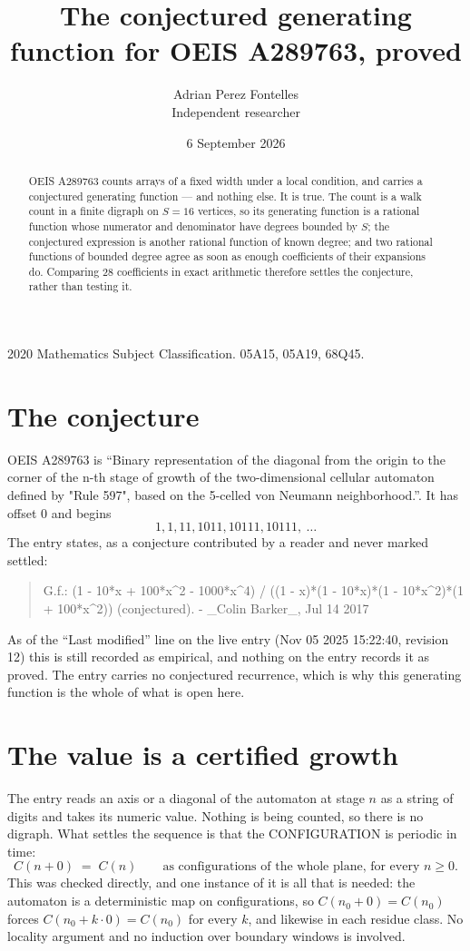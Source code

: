 \documentclass[11pt,a4paper]{article}
\title{The conjectured generating function for OEIS A289763, proved}
\author{Adrian Perez Fontelles\\ \small Independent researcher}
\date{6 September 2026}
\theoremstyle{plain}
\theoremstyle{definition}
\begin{document}
\maketitle

\begin{abstract}
OEIS A289763 counts arrays of a fixed width under a local condition, and carries a conjectured
generating function --- and nothing else. It is true. The count is a walk count in a finite
digraph on $S=16$ vertices, so its generating function is a rational function whose numerator
and denominator have degrees bounded by $S$; the conjectured expression is another rational
function of known degree; and two rational functions of bounded degree agree as soon as enough
coefficients of their expansions do. Comparing $28$ coefficients in exact arithmetic
therefore settles the conjecture, rather than testing it.
\end{abstract}

\noindent\small 2020 Mathematics Subject Classification. 05A15, 05A19, 68Q45.\normalsize

\section{The conjecture}

OEIS A289763 is ``Binary representation of the diagonal from the origin to the corner of the n-th stage of growth of the two-dimensional cellular automaton defined by "Rule 597", based on the 5-celled von Neumann neighborhood.''. It has offset $0$ and begins
\[
1, 1, 11, 1011, 10111, 10111,\ \dots
\]
The entry states, as a conjecture contributed by a reader and never marked settled:
\begin{quote}
G.f.: (1 - 10*x + 100*x\^{}2 - 1000*x\^{}4) / ((1 - x)*(1 - 10*x)*(1 - 10*x\^{}2)*(1 + 100*x\^{}2)) (conjectured). - \_Colin Barker\_, Jul 14 2017
\end{quote}
As of the ``Last modified'' line on the live entry (Nov 05 2025 15:22:40, revision 12) this is still
recorded as empirical, and nothing on the entry records it as proved. The entry carries no
conjectured recurrence, which is why this generating function is the whole of what is open
here.


\section{The value is a certified growth}

The entry reads an axis or a diagonal of the automaton at stage $n$ as a string of digits and
takes its numeric value. Nothing is being counted, so there is no digraph. What settles the
sequence is that the CONFIGURATION is periodic in time:
\[
C(n+0)\;=\;C(n)\qquad\text{as configurations of the whole plane, for every } n\ge 0.
\]
This was checked directly, and one instance of it is all that is needed: the automaton is a
deterministic map on configurations, so $C(n_0+0)=C(n_0)$ forces $C(n_0+k\cdot0)=C(n_0)$ for
every $k$, and likewise in each residue class. No locality argument and no induction over
boundary windows is involved.
\end{document}

